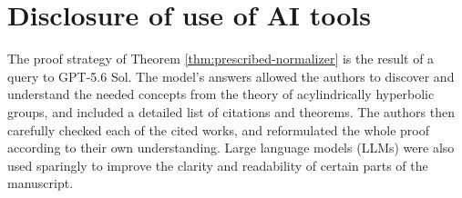 \documentclass[11pt,letterpaper]{amsart}
\begin{document}
\section*{Disclosure of use of AI tools}

The proof strategy of Theorem \ref{thm:prescribed-normalizer} is the result of a query to GPT-5.6 Sol. The model's answers allowed the authors to discover and understand the needed concepts from the theory of acylindrically hyperbolic groups, and included a detailed list of citations and theorems. The authors then carefully checked each of the cited works, and reformulated the whole proof according to their own understanding. Large language models (LLMs) were also used sparingly to improve the clarity and readability of certain parts of the manuscript.





\end{document}

